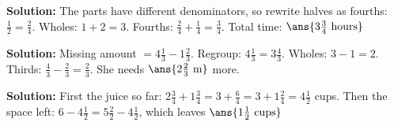\documentclass[12pt]{article}
\begin{document}

\textbf{Solution:} The parts have different denominators, so rewrite halves
as fourths: $\tfrac{1}{2} = \tfrac{2}{4}$. Wholes: $1 + 2 = 3$. Fourths:
$\tfrac{2}{4} + \tfrac{1}{4} = \tfrac{3}{4}$. Total time:
$\ans{3\tfrac{3}{4}\ \text{hours}}$


\textbf{Solution:} Missing amount $= 4\tfrac{1}{3} - 1\tfrac{2}{3}$. Regroup:
$4\tfrac{1}{3} = 3\tfrac{4}{3}$. Wholes: $3 - 1 = 2$. Thirds:
$\tfrac{4}{3} - \tfrac{2}{3} = \tfrac{2}{3}$. She needs
$\ans{2\tfrac{2}{3}\ \text{m}}$ more.


\textbf{Solution:} First the juice so far:
$2\tfrac{3}{4} + 1\tfrac{3}{4} = 3 + \tfrac{6}{4} = 3 + 1\tfrac{2}{4} =
4\tfrac{1}{2}$ cups. Then the space left:
$6 - 4\tfrac{1}{2} = 5\tfrac{2}{2} - 4\tfrac{1}{2}$, which leaves
$\ans{1\tfrac{1}{2}\ \text{cups}}$
\end{document}
